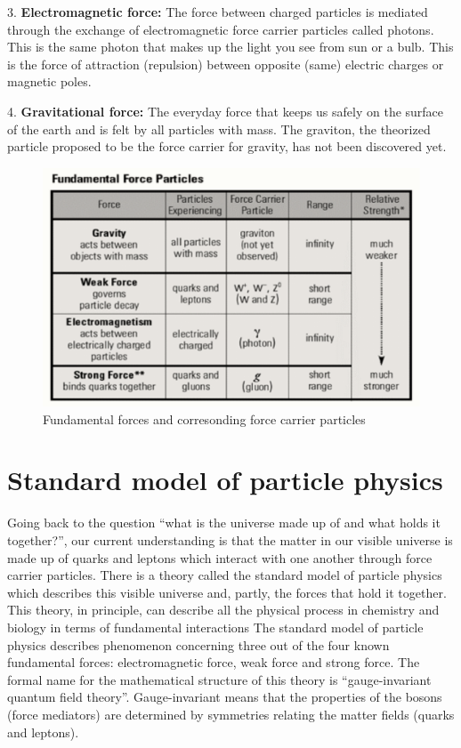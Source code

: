 3.	{\bf Electromagnetic force:}
The force between charged particles is mediated through the exchange of electromagnetic force carrier particles called photons.  This is the same photon that makes up the light you see from sun or a bulb. This is the force of attraction (repulsion) between opposite (same) electric charges or magnetic poles. 

4.	{\bf Gravitational force: }
The everyday force that keeps us safely on the surface of the earth and is felt by all particles with mass. The graviton, the theorized particle proposed to be the force carrier for gravity, 
has not been discovered yet. 


\begin{figure}[h]
\centering\includegraphics[scale=0.5]{./ElementaryParticles/Pictures/fig4.pdf}
\caption{Fundamental forces and corresonding force carrier particles}
\label{fig:fig4}
\end{figure}




\section{Standard model of particle physics}
Going back to the question ``what is the universe made up of and what holds it together?”, 
our current understanding is that the matter in our visible universe is made up of quarks and leptons which interact with one another through force carrier particles.  There is a theory called the standard model of particle physics which describes this visible universe and, partly, the forces that hold it together. This theory, in principle, can describe all the physical process in chemistry and biology in terms of fundamental interactions The standard model of particle physics describes phenomenon concerning three out of the four known 
fundamental forces: electromagnetic force, weak force and strong force. The formal name for the mathematical structure of this theory is “gauge-invariant quantum field theory”.  Gauge-invariant means that the properties of the bosons (force mediators) are determined by symmetries relating the matter fields (quarks and leptons). 

